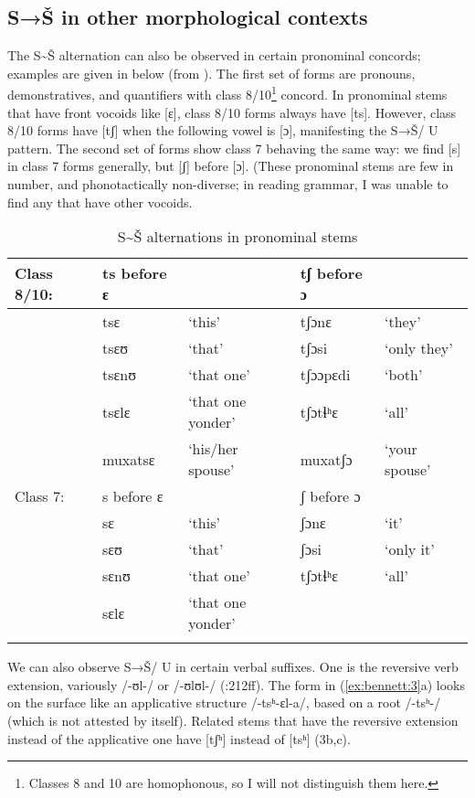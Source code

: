 \subsection{S→Š in other morphological contexts}\label{sec:bennett:2.4}

The S{\textasciitilde}Š alternation can also be observed in certain pronominal concords; examples are given in  below (from \citealt{Cole1955}). The first set of forms are pronouns, demonstratives, and quantifiers with class 8/10\footnote{Classes 8 and 10 are homophonous, so I will not distinguish them here.} concord. In pronominal stems that have front vocoids like [ɛ], class 8/10 forms always have [ts]. However, class 8/10 forms have [tʃ] when the following vowel is [ɔ], manifesting the S→Š/ {\longrule} U pattern. The second set of forms show class 7 behaving the same way: we find [s] in class 7 forms generally, but [ʃ] before [ɔ]. (These pronominal stems are few in number, and phonotactically non-diverse; in reading  grammar, I was unable to find any that have other vocoids.

\begin{table}
\begin{tabularx}{\textwidth}{llQll}
\lsptoprule
Class 8/10: & ts before ɛ &  & tʃ before ɔ & \\
\midrule
& tsɛ & ‘this’ & tʃɔnɛ & ‘they’\\
& tsɛʊ & ‘that’ & tʃɔsi & ‘only they’\\
& tsɛnʊ & ‘that one’ & tʃɔɔpɛdi & ‘both’\\
& tsɛlɛ & ‘that one yonder’ & tʃɔtɬʰɛ & ‘all’\\
& muxatsɛ & ‘his/her spouse’ & muxatʃɔ & ‘your spouse’\\
\midrule
Class 7: & s before ɛ &  & ʃ before ɔ & \\
\midrule
& sɛ & ‘this’ & ʃɔnɛ & ‘it’\\
& sɛʊ & ‘that’ & ʃɔsi & ‘only it’\\
& sɛnʊ & ‘that one’ & tʃɔtɬʰɛ & ‘all’\\
& sɛlɛ & ‘that one yonder’ &  & \\
\lspbottomrule
\end{tabularx}
\caption{S{\textasciitilde}Š alternations in pronominal stems\label{tab:bennett:3}}
\end{table}

We can also observe S→Š/ {\longrule} U in certain verbal suffixes. One is the reversive verb extension, variously /-ʊl-/ or /-ʊlʊl-/  (\citealt{Cole1955}:212ff). The form in (\ref{ex:bennett:3}a) looks on the surface like an applicative structure /-tsʰ-ɛl-a/, based on a root /-tsʰ-/ (which is not attested by itself). Related stems that have the reversive extension instead of the applicative one have [tʃʰ] instead of [tsʰ] (3b,c).

